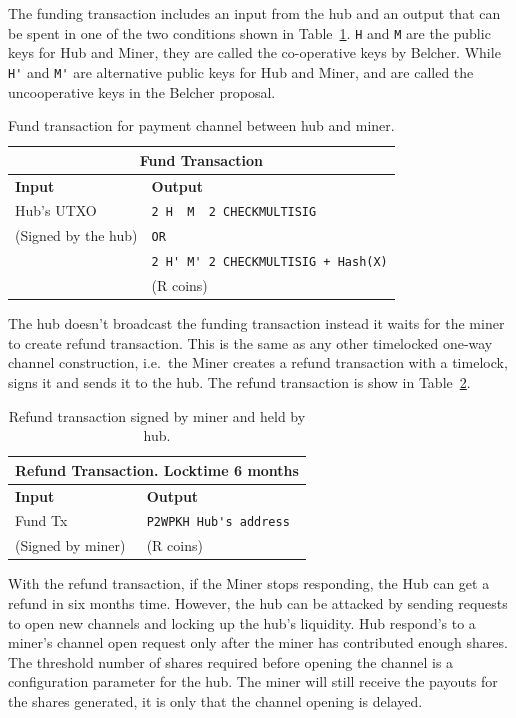 \documentclass{article}
\begin{document}
The funding transaction includes an input from the hub and an output
that can be spent in one of the two conditions shown in
Table~\ref{fund-tx}. \verb|H| and \verb|M| are the public keys for Hub
and Miner, they are called the co-operative keys by Belcher. While
\verb|H'| and \verb|M'| are alternative public keys for Hub and Miner,
and are called the uncooperative keys in the Belcher proposal.


\begin{table}
  \centering
  \begin{tabular}{ ll }
    \multicolumn{2}{c}{\bfseries Fund Transaction} \\
    \midrule
    \bfseries Input & \bfseries Output \\
    \midrule
    Hub's UTXO & \verb|2 H  M  2 CHECKMULTISIG| \\
    (Signed by the hub) & \verb|OR| \\
                    & \verb|2 H' M' 2 CHECKMULTISIG + Hash(X)| \\
    & (R coins) \\
    \midrule
  \end{tabular}
  \caption{Fund transaction for payment channel between hub and miner.}\label{fund-tx}
\end{table}


The hub doesn't broadcast the funding transaction instead it waits for
the miner to create refund transaction. This is the same as any other
timelocked one-way channel construction, i.e.\ the Miner creates a
refund transaction with a timelock, signs it and sends it to the
hub. The refund transaction is show in Table~\ref{refund-tx}.

\begin{table}
  \centering
  \begin{tabular}{ ll }
    \multicolumn{2}{c}{\bfseries Refund Transaction. Locktime 6 months} \\
    \midrule
    \bfseries Input & \bfseries Output \\
    \midrule
    Fund Tx & \verb|P2WPKH Hub's address| \\
    (Signed by miner) & (R coins) \\
    \midrule
  \end{tabular}
  \caption{Refund transaction signed by miner and held by
    hub.}\label{refund-tx}
\end{table}

With the refund transaction, if the Miner stops responding, the Hub
can get a refund in six months time. However, the hub can be attacked
by sending requests to open new channels and locking up the hub's
liquidity. Hub respond's to a miner's channel open request only after
the miner has contributed enough shares. The threshold number of
shares required before opening the channel is a configuration
parameter for the hub. The miner will still receive the payouts for
the shares generated, it is only that the channel opening is delayed.
\end{document}
